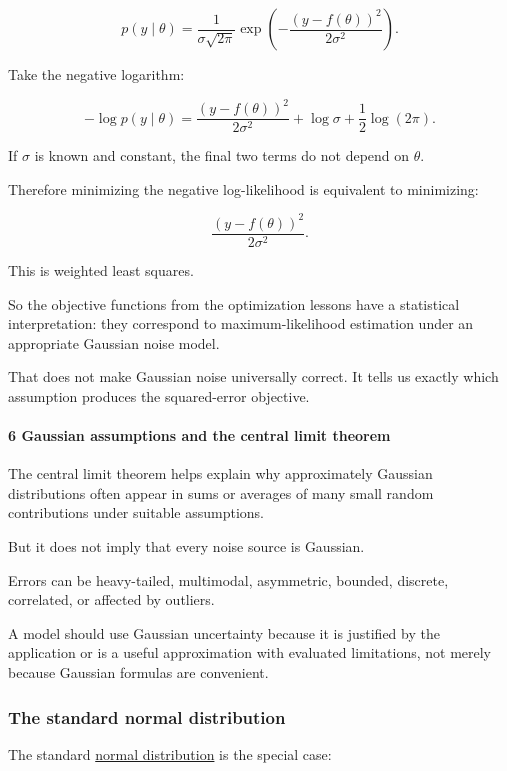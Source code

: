\[
 p(y\mid\theta) = \frac1{\sigma\sqrt{2\pi}} \exp\left( -\frac{(y-f(\theta))^2}{2\sigma^2} \right).
\]

Take the negative logarithm:

\[
 -\log p(y\mid\theta) = \frac{(y-f(\theta))^2}{2\sigma^2} +\log\sigma+\frac12\log(2\pi).
\]

If \(\sigma\) is known and constant, the final two terms do not depend on \(\theta\).

Therefore minimizing the negative log-likelihood is equivalent to minimizing:

\[
 \boxed{ \frac{(y-f(\theta))^2}{2\sigma^2} }.
\]

This is weighted least squares.

So the objective functions from the optimization lessons have a statistical interpretation: they correspond to maximum-likelihood estimation under an appropriate Gaussian noise model.

That does not make Gaussian noise universally correct. It tells us exactly which assumption produces the squared-error objective.

\paragraph{6 Gaussian assumptions and the central limit theorem}\label{gaussian-assumptions-and-the-central-limit-theorem}

The central limit theorem helps explain why approximately Gaussian distributions often appear in sums or averages of many small random contributions under suitable assumptions.

But it does not imply that every noise source is Gaussian.

Errors can be heavy-tailed, multimodal, asymmetric, bounded, discrete, correlated, or affected by outliers.

A model should use Gaussian uncertainty because it is justified by the application or is a useful approximation with evaluated limitations, not merely because Gaussian formulas are convenient.

\subsubsection{The standard normal distribution}\label{the-standard-normal-distribution}

The standard \hyperref[02-foundations-ii-ch023]{normal distribution} is the special case:

